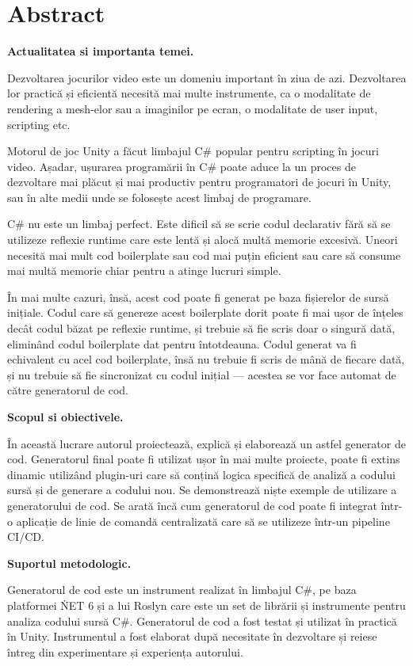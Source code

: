 \documentclass[a4paper,12pt]{report}
\begin{document}
\chapter*{Abstract}

\textbf{Actualitatea si importanta temei.}

Dezvoltarea jocurilor video este un domeniu important în ziua de azi.
Dezvoltarea lor practică și eficientă necesită mai multe instrumente, ca o modalitate de rendering a mesh-elor sau a imaginilor pe ecran, o modalitate de user input, scripting etc.

Motorul de joc Unity a făcut limbajul C\# popular pentru scripting în jocuri video.
Așadar, ușurarea programării în C\# poate aduce la un proces de dezvoltare mai plăcut și mai productiv pentru programatori de jocuri în Unity, sau în alte medii unde se folosește acest limbaj de programare.

C\# nu este un limbaj perfect.
Este dificil să se scrie codul declarativ fără să se utilizeze reflexie runtime care este lentă și alocă multă memorie excesivă.
Uneori necesită mai mult cod boilerplate sau cod mai puțin eficient sau care să consume mai multă memorie chiar pentru a atinge lucruri simple.

În mai multe cazuri, însă, acest cod poate fi generat pe baza fișierelor de sursă inițiale.
Codul care să genereze acest boilerplate dorit poate fi mai ușor de înțeles decât codul băzat pe reflexie runtime, și trebuie să fie scris doar o singură dată, eliminând codul boilerplate dat pentru întotdeauna.
Codul generat va fi echivalent cu acel cod boilerplate, însă nu trebuie fi scris de mână de fiecare dată, și nu trebuie să fie sincronizat cu codul inițial — acestea se vor face automat de către generatorul de cod.


\textbf{Scopul si obiectivele.}

În această lucrare autorul proiectează, explică și elaborează un astfel generator de cod.
Generatorul final poate fi utilizat ușor în mai multe proiecte, poate fi extins dinamic utilizând plugin-uri care să conțină logica specifică de analiză a codului sursă și de generare a codului nou.
Se demonstrează niște exemple de utilizare a generatorului de cod.
Se arată încă cum generatorul de cod poate fi integrat într-o aplicație de linie de comandă centralizată care să se utilizeze într-un pipeline CI/CD.

\textbf{Suportul metodologic.}

Generatorul de cod este un instrument realizat în limbajul C\#, pe baza platformei \. NET 6 și a lui Roslyn care este un set de librării și instrumente pentru analiza codului sursă C\#.
Generatorul de cod a fost testat și utilizat în practică în Unity.
Instrumentul a fost elaborat după necesitate în dezvoltare și reiese întreg din experimentare și experiența autorului.
\end{document}
